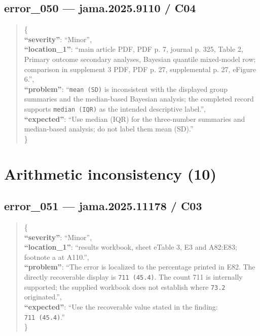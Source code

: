 \documentclass[
  letterpaper,
  9pt]{extreport}
\begin{document}
\hypertarget{error_050--jama20259110--c04}{%
\subsection{error\_050 --- jama.2025.9110 /
C04}\label{error_050--jama20259110--c04}}

\begin{quote}
\{\\
\textbf{``severity''}: ``Minor'',\\
\textbf{``location\_1''}: ``main article PDF, PDF p. 7, journal p. 325,
Table 2, Primary outcome secondary analyses, Bayesian quantile
mixed-model row; comparison in supplement 3 PDF, PDF p. 27, supplemental
p. 27, eFigure 6.'',\\
\textbf{``problem''}: ``\texttt{mean\ (SD)} is inconsistent with the
displayed group summaries and the median-based Bayesian analysis; the
completed record supports \texttt{median\ (IQR)} as the intended
descriptive label.'',\\
\textbf{``expected''}: ``Use median (IQR) for the three-number summaries
and median-based analysis; do not label them mean (SD).''\\
\}
\end{quote}

\hypertarget{arithmetic-inconsistency-10}{%
\section{Arithmetic inconsistency
(10)}\label{arithmetic-inconsistency-10}}

\hypertarget{error_051--jama202511178--c03}{%
\subsection{error\_051 --- jama.2025.11178 /
C03}\label{error_051--jama202511178--c03}}

\begin{quote}
\{\\
\textbf{``severity''}: ``Minor'',\\
\textbf{``location\_1''}: ``results workbook, sheet eTable 3, E3 and
A82:E83; footnote a at A110.'',\\
\textbf{``problem''}: ``The error is localized to the percentage printed
in E82. The directly recoverable display is \texttt{711\ (45.4)}. The
count 711 is internally supported; the supplied workbook does not
establish where \texttt{73.2} originated.'',\\
\textbf{``expected''}: ``Use the recoverable value stated in the
finding: \texttt{711\ (45.4)}.''\\
\}
\end{quote}
\end{document}
